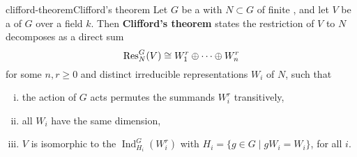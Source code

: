 \begin{topic}{clifford-theorem}{Clifford's theorem}
    Let $G$ be a  with  $N \subset G$ of finite , and let $V$ be a   of $G$ over a field $k$. Then \textbf{Clifford's theorem} states the restriction of $V$ to $N$ decomposes as a direct sum
    \[ \textup{Res}^G_N(V) \cong W_1^r \oplus \cdots \oplus W_n^r \]
    for some $n, r \ge 0$ and distinct irreducible representations $W_i$ of $N$, such that
    \begin{enumerate}[(i)]
        \item the action of $G$ acts permutes the summands $W_i^r$ transitively,
        \item all $W_i$ have the same dimension,
        \item $V$ is isomorphic to the  $\operatorname{Ind}_{H_i}^G(W_i^r)$ with $H_i = \{ g \in G \mid g W_i = W_i \}$, for all $i$.
    \end{enumerate}
\end{topic}
